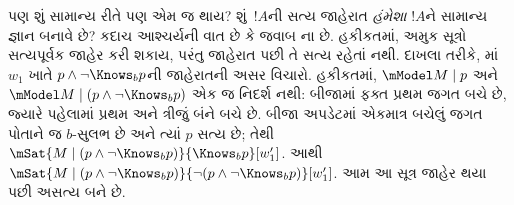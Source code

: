 પણ શું સામાન્ય રીતે પણ એમ જ થાય? શું~$!A$ની સત્ય જાહેરાત
\emph{હંમેશા} $!A$ને સામાન્ય જ્ઞાન બનાવે છે? કદાચ આશ્ચર્યની વાત
છે કે જવાબ ના છે. હકીકતમાં, અમુક સૂત્રો સત્યપૂર્વક
જાહેર કરી શકાય, પરંતુ જાહેરાત પછી તે સત્ય રહેતાં નથી. દાખલા
તરીકે, માં~$w_1$ ખાતે
$p \land \lnot \Knows_b p$ની જાહેરાતની અસર વિચારો.
હકીકતમાં, $\mModel M \mid p$ અને
$\mModel M \mid (p \land \lnot \Knows_b p)$ એક જ નિદર્શ
નથી: બીજામાં ફક્ત પ્રથમ જગત બચે છે, જ્યારે પહેલામાં પ્રથમ
અને ત્રીજું બંને બચે છે. બીજા અપડેટમાં એકમાત્ર બચેલું
જગત પોતાને જ $b$-સુલભ છે અને ત્યાં $p$ સત્ય છે; તેથી
$\mSat{M \mid (p\land\lnot\Knows_b p)}{\Knows_b p}[w'_1]$.
આથી
$\mSat{M \mid (p \land \lnot \Knows_b p)}{\lnot
(p \land \lnot \Knows_b p)}[w'_1]$. આમ આ સૂત્ર
જાહેર થયા પછી અસત્ય બને છે.
\endgroup



\OLEndPartHook
\endgroup


\OLEndPartHook
